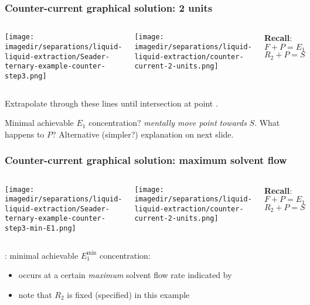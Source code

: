 \begin{frame}\frametitle{Counter-current graphical solution: 2 units}
	\begin{columns}[t]
			\begin{center}
				\texttt{[image: \\imagedir/separations/liquid-liquid-extraction/Seader-ternary-example-counter-step3.png]}
			\end{center}
			\begin{center}
				\texttt{[image: \\imagedir/separations/liquid-liquid-extraction/counter-current-2-units.png]}
			\end{center}
			\textbf{Recall}: 
			\vspace{-10pt}
			\[	F + P = E_1 \]
			\[	R_2 + P = S \]			
	\end{columns}
	\begin{exampleblock}{}
		Extrapolate through these lines until intersection at point {\color{myGreen}{$P$}}.
	\end{exampleblock}	
	\vspace{-6pt}
	{\small
		Minimal achievable $E_1$ concentration? \emph{mentally move point} {\color{myRed}{$M$}} \emph{towards} $S$. What happens to $P$? Alternative (simpler?) explanation on next slide.
	}
\end{frame}

\begin{frame}\frametitle{Counter-current graphical solution: maximum solvent flow}
	\begin{columns}[t]
			\begin{center}
				\texttt{[image: \\imagedir/separations/liquid-liquid-extraction/Seader-ternary-example-counter-step3-min-E1.png]}
			\end{center}
			\begin{center}
				\texttt{[image: \\imagedir/separations/liquid-liquid-extraction/counter-current-2-units.png]}
			\end{center}
			\textbf{Recall}: 
			\vspace{-10pt}
			\[	F + P = E_1 \]
			\[	R_2 + P = S \]			
	\end{columns}
	\vspace{12pt}
	{\color{myOrange}{Subtle point}}: minimal achievable $E^\text{min}_1$ concentration: 
	{\small
		\begin{itemize}
			\item	occurs at a certain \emph{maximum} solvent flow rate indicated by {\LARGE{\color{myRed}{$\mathbf{\circ}$}}}
			\vspace{-6pt}
			\item	note that $R_2$ is fixed (specified) in this example
		\end{itemize}
	}
\end{frame}

